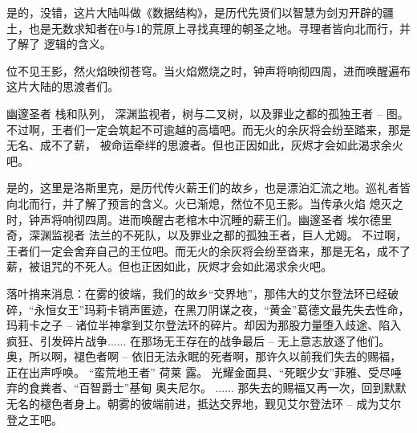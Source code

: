 是的，没错，这片大陆叫做《数据结构》，是历代先贤们以智慧为剑刃开辟的疆土，也是无数求知者在0与1的荒原上寻找真理的朝圣之地。寻理者皆向北而行，并了解了
逻辑的含义。


位不见王影，然火焰映彻苍穹。当火焰燃烧之时，钟声将响彻四周，进而唤醒遍布这片大陆的思渡者们。

幽邃圣者 栈和队列， 深渊监视者，树与二叉树，以及罪业之都的孤独王者 -- 图。不过啊，王者们一定会筑起不可逾越的高墙吧。而无火的余灰将会纷至踏来，那是无名、成不了薪，
被命运牵绊的思渡者。但也正因如此，灰烬才会如此渴求余火吧。



是的，这里是洛斯里克，是历代传火薪王们的故乡，也是漂泊汇流之地。巡礼者皆向北而行，并了解了预言的含义。火已渐熄，然位不见王影。当传承火焰
熄灭之时，钟声将响彻四周。进而唤醒古老棺木中沉睡的薪王们。幽邃圣者 埃尔德里奇，深渊监视者 法兰的不死队，以及罪业之都的孤独王者，巨人尤姆。
不过啊，王者们一定会舍弃自己的王位吧。而无火的余灰将会纷至沓来，那是无名，成不了薪，被诅咒的不死人。但也正因如此，灰烬才会如此渴求余火吧。

落叶捎来消息：在雾的彼端，我们的故乡“交界地”，那伟大的艾尔登法环已经破碎，“永恒女王”玛莉卡销声匿迹，在黑刀阴谋之夜，“黄金”葛德文最先失去性命，玛莉卡之子 -- 
诸位半神拿到艾尔登法环的碎片。却因为那股力量堕入歧途、陷入疯狂、引发碎片战争...... 
在那场无王存在的战争最后 -- 无上意志放逐了他们。奥，所以啊，褪色者啊 -- 依旧无法永眠的死者啊，那许久以前我们失去的赐福，正在出声呼唤。
“蛮荒地王者” 荷莱 露。 光耀金面具、“死眠少女”菲雅、受尽唾弃的食粪者、“百智爵士”基甸 奥夫尼尔。
...... 那失去的赐福又再一次，回到默默无名的褪色者身上。朝雾的彼端前进，抵达交界地，觐见艾尔登法环 -- 成为艾尔登之王吧。

